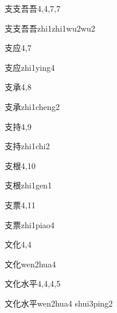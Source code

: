 \begin{entry}{支支吾吾}{4,4,7,7}
  \begin{phonetics}{支支吾吾}{zhi1zhi1wu2wu2}
  \end{phonetics}
\end{entry}

\begin{entry}{支应}{4,7}
  \begin{phonetics}{支应}{zhi1ying4}
  \end{phonetics}
\end{entry}

\begin{entry}{支承}{4,8}
  \begin{phonetics}{支承}{zhi1cheng2}
  \end{phonetics}
\end{entry}

\begin{entry}{支持}{4,9}
  \begin{phonetics}{支持}{zhi1chi2}
  \end{phonetics}
\end{entry}

\begin{entry}{支根}{4,10}
  \begin{phonetics}{支根}{zhi1gen1}
  \end{phonetics}
\end{entry}

\begin{entry}{支票}{4,11}
  \begin{phonetics}{支票}{zhi1piao4}
  \end{phonetics}
\end{entry}

\begin{entry}{文化}{4,4}
  \begin{phonetics}{文化}{wen2hua4}
  \end{phonetics}
\end{entry}

\begin{entry}{文化水平}{4,4,4,5}
  \begin{phonetics}{文化水平}{wen2hua4 shui3ping2}
  \end{phonetics}
\end{entry}

